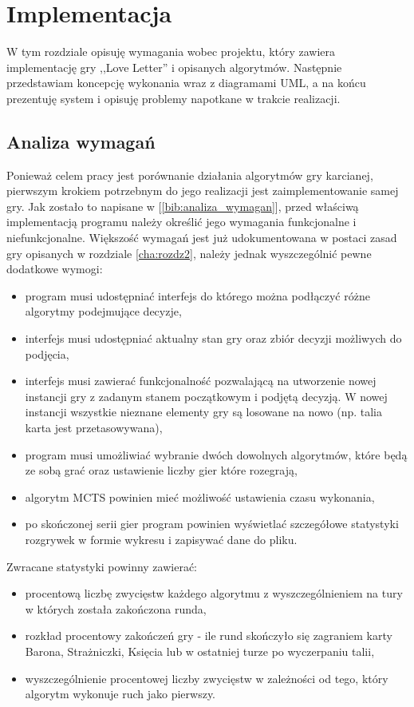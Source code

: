 \chapter{Implementacja}
\label{cha:rozdz4}

W tym rozdziale opisuję wymagania wobec projektu, który zawiera implementację gry ,,Love Letter'' i opisanych algorytmów. Następnie przedstawiam koncepcję wykonania wraz z diagramami UML, a na końcu prezentuję system i opisuję problemy napotkane w trakcie realizacji.

\section{Analiza wymagań}
Ponieważ celem pracy jest porównanie działania algorytmów gry karcianej, pierwszym krokiem potrzebnym do jego realizacji jest zaimplementowanie samej gry. Jak zostało to napisane w [\ref{bib:analiza_wymagan}], przed właściwą implementacją programu należy określić jego wymagania funkcjonalne i niefunkcjonalne. Większość wymagań jest już udokumentowana w postaci zasad gry opisanych w rozdziale \ref{cha:rozdz2}, należy jednak wyszczególnić pewne dodatkowe wymogi:
\begin{itemize}
	\item program musi udostępniać interfejs do którego można podłączyć różne algorytmy podejmujące decyzje,
	\item interfejs musi udostępniać aktualny stan gry oraz zbiór decyzji możliwych do podjęcia,
	\item interfejs musi zawierać funkcjonalność pozwalającą na utworzenie nowej instancji gry z zadanym stanem początkowym i podjętą decyzją. W nowej instancji wszystkie nieznane elementy gry są losowane na nowo (np. talia karta jest przetasowywana),
	\item program musi umożliwiać wybranie dwóch dowolnych algorytmów, które będą ze sobą grać oraz ustawienie liczby gier które rozegrają,
	\item algorytm MCTS powinien mieć możliwość ustawienia czasu wykonania,
	\item po skończonej serii gier program powinien wyświetlać szczegółowe statystyki rozgrywek w formie wykresu i zapisywać dane do pliku.
\end{itemize}
Zwracane statystyki powinny zawierać:
\begin{itemize}
	\item procentową liczbę zwycięstw każdego algorytmu z wyszczególnieniem na tury w których została zakończona runda,
	\item rozkład procentowy zakończeń gry - ile rund skończyło się zagraniem karty Barona, Strażniczki, Księcia lub w ostatniej turze po wyczerpaniu talii,
	\item wyszczególnienie procentowej liczby zwycięstw w zależności od tego, który algorytm wykonuje ruch jako pierwszy.
\end{itemize}

